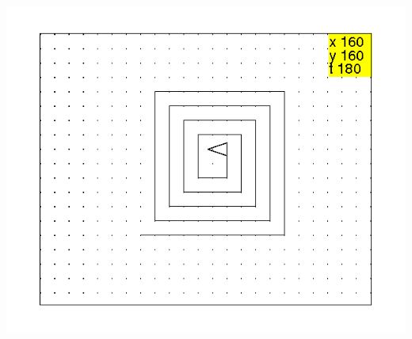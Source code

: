 \documentclass[a4paper,11pt]{book}
\begin{document}
\includegraphics[width=\textwidth]{tortspir}
\end{document}
